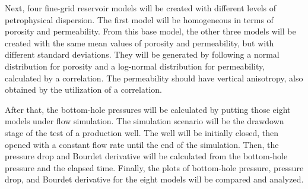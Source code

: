 Next, four fine-grid reservoir models will be created with different levels of petrophysical dispersion.
%
The first model will be homogeneous in terms of porosity and permeability.
%
From this base model, the other three models will be created with the same mean values of porosity and permeability, but with different standard deviations.
%
They will be generated by following a normal distribution for porosity and a log-normal distribution for permeability, calculated by a correlation.
%
The permeability should have vertical anisotropy, also obtained by the utilization of a correlation. 

After that, the bottom-hole pressures will be calculated by putting those eight models under flow simulation.
%
The simulation scenario will be the drawdown stage of the test of a production well.
%
The well will be initially closed, then opened with a constant flow rate until the end of the simulation.
%
Then, the pressure drop and Bourdet derivative will be calculated from the bottom-hole pressure and the elapsed time.
%
Finally, the plots of bottom-hole pressure, pressure drop, and Bourdet derivative for the eight models will be compared and analyzed.